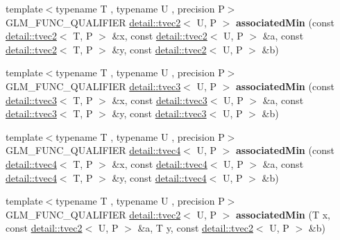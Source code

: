 \begin{DoxyCompactItemize}
\item 
{\footnotesize template$<$typename T , typename U , precision P$>$ }\\G\+L\+M\+\_\+\+F\+U\+N\+C\+\_\+\+Q\+U\+A\+L\+I\+F\+I\+ER \hyperlink{structglm_1_1detail_1_1tvec2}{detail\+::tvec2}$<$ U, P $>$ {\bfseries associated\+Min} (const \hyperlink{structglm_1_1detail_1_1tvec2}{detail\+::tvec2}$<$ T, P $>$ \&x, const \hyperlink{structglm_1_1detail_1_1tvec2}{detail\+::tvec2}$<$ U, P $>$ \&a, const \hyperlink{structglm_1_1detail_1_1tvec2}{detail\+::tvec2}$<$ T, P $>$ \&y, const \hyperlink{structglm_1_1detail_1_1tvec2}{detail\+::tvec2}$<$ U, P $>$ \&b)\hypertarget{namespaceglm_a6f7aa32f2c2628328b04cb06972161ef}{}\label{namespaceglm_a6f7aa32f2c2628328b04cb06972161ef}

\item 
{\footnotesize template$<$typename T , typename U , precision P$>$ }\\G\+L\+M\+\_\+\+F\+U\+N\+C\+\_\+\+Q\+U\+A\+L\+I\+F\+I\+ER \hyperlink{structglm_1_1detail_1_1tvec3}{detail\+::tvec3}$<$ U, P $>$ {\bfseries associated\+Min} (const \hyperlink{structglm_1_1detail_1_1tvec3}{detail\+::tvec3}$<$ T, P $>$ \&x, const \hyperlink{structglm_1_1detail_1_1tvec3}{detail\+::tvec3}$<$ U, P $>$ \&a, const \hyperlink{structglm_1_1detail_1_1tvec3}{detail\+::tvec3}$<$ T, P $>$ \&y, const \hyperlink{structglm_1_1detail_1_1tvec3}{detail\+::tvec3}$<$ U, P $>$ \&b)\hypertarget{namespaceglm_a72be26bfaf248286d35e8c409432dc7b}{}\label{namespaceglm_a72be26bfaf248286d35e8c409432dc7b}

\item 
{\footnotesize template$<$typename T , typename U , precision P$>$ }\\G\+L\+M\+\_\+\+F\+U\+N\+C\+\_\+\+Q\+U\+A\+L\+I\+F\+I\+ER \hyperlink{structglm_1_1detail_1_1tvec4}{detail\+::tvec4}$<$ U, P $>$ {\bfseries associated\+Min} (const \hyperlink{structglm_1_1detail_1_1tvec4}{detail\+::tvec4}$<$ T, P $>$ \&x, const \hyperlink{structglm_1_1detail_1_1tvec4}{detail\+::tvec4}$<$ U, P $>$ \&a, const \hyperlink{structglm_1_1detail_1_1tvec4}{detail\+::tvec4}$<$ T, P $>$ \&y, const \hyperlink{structglm_1_1detail_1_1tvec4}{detail\+::tvec4}$<$ U, P $>$ \&b)\hypertarget{namespaceglm_a320da0e398dd2c7675b8be6755abbcd2}{}\label{namespaceglm_a320da0e398dd2c7675b8be6755abbcd2}

\item 
{\footnotesize template$<$typename T , typename U , precision P$>$ }\\G\+L\+M\+\_\+\+F\+U\+N\+C\+\_\+\+Q\+U\+A\+L\+I\+F\+I\+ER \hyperlink{structglm_1_1detail_1_1tvec2}{detail\+::tvec2}$<$ U, P $>$ {\bfseries associated\+Min} (T x, const \hyperlink{structglm_1_1detail_1_1tvec2}{detail\+::tvec2}$<$ U, P $>$ \&a, T y, const \hyperlink{structglm_1_1detail_1_1tvec2}{detail\+::tvec2}$<$ U, P $>$ \&b)\hypertarget{namespaceglm_a1e99d87b527fe65cc8d972a2284d3f95}{}\label{namespaceglm_a1e99d87b527fe65cc8d972a2284d3f95}


\end{DoxyCompactItemize}
